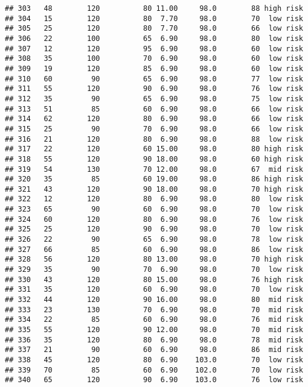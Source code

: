 \documentclass[
  ignorenonframetext,
]{beamer}
\begin{document}
\begin{frame}[fragile]
\begin{verbatim}
## 303   48        120          80 11.00     98.0        88 high risk
## 304   15        120          80  7.70     98.0        70  low risk
## 305   25        120          80  7.70     98.0        66  low risk
## 306   22        100          65  6.90     98.0        80  low risk
## 307   12        120          95  6.90     98.0        60  low risk
## 308   35        100          70  6.90     98.0        60  low risk
## 309   19        120          85  6.90     98.0        60  low risk
## 310   60         90          65  6.90     98.0        77  low risk
## 311   55        120          90  6.90     98.0        76  low risk
## 312   35         90          65  6.90     98.0        75  low risk
## 313   51         85          60  6.90     98.0        66  low risk
## 314   62        120          80  6.90     98.0        66  low risk
## 315   25         90          70  6.90     98.0        66  low risk
## 316   21        120          80  6.90     98.0        88  low risk
## 317   22        120          60 15.00     98.0        80 high risk
## 318   55        120          90 18.00     98.0        60 high risk
## 319   54        130          70 12.00     98.0        67  mid risk
## 320   35         85          60 19.00     98.0        86 high risk
## 321   43        120          90 18.00     98.0        70 high risk
## 322   12        120          80  6.90     98.0        80  low risk
## 323   65         90          60  6.90     98.0        70  low risk
## 324   60        120          80  6.90     98.0        76  low risk
## 325   25        120          90  6.90     98.0        70  low risk
## 326   22         90          65  6.90     98.0        78  low risk
## 327   66         85          60  6.90     98.0        86  low risk
## 328   56        120          80 13.00     98.0        70 high risk
## 329   35         90          70  6.90     98.0        70  low risk
## 330   43        120          80 15.00     98.0        76 high risk
## 331   35        120          60  6.90     98.0        70  low risk
## 332   44        120          90 16.00     98.0        80  mid risk
## 333   23        130          70  6.90     98.0        70  mid risk
## 334   22         85          60  6.90     98.0        76  mid risk
## 335   55        120          90 12.00     98.0        70  mid risk
## 336   35        120          80  6.90     98.0        78  mid risk
## 337   21         90          60  6.90     98.0        86  mid risk
## 338   45        120          80  6.90    103.0        70  low risk
## 339   70         85          60  6.90    102.0        70  low risk
## 340   65        120          90  6.90    103.0        76  low risk

\end{verbatim}
\end{frame}
\end{document}
